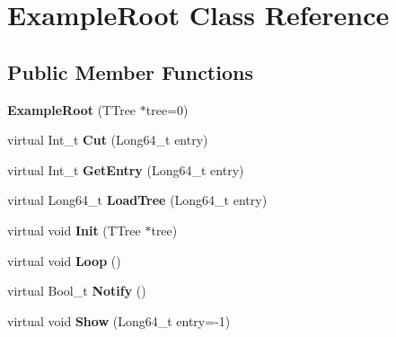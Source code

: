 \hypertarget{classExampleRoot}{
\section{ExampleRoot Class Reference}
\label{classExampleRoot}
}
\subsection*{Public Member Functions}
\begin{DoxyCompactItemize}
\item 
\hypertarget{classExampleRoot_a676a00459c76535ea0cc496333e0927f}{
{\bfseries ExampleRoot} (TTree $\ast$tree=0)}
\label{classExampleRoot_a676a00459c76535ea0cc496333e0927f}

\item 
\hypertarget{classExampleRoot_aa76fc5be93bb26800ef2d47b86db68ab}{
virtual Int\_\-t {\bfseries Cut} (Long64\_\-t entry)}
\label{classExampleRoot_aa76fc5be93bb26800ef2d47b86db68ab}

\item 
\hypertarget{classExampleRoot_aeaa244a73538e72d6d4431d6755e6aa9}{
virtual Int\_\-t {\bfseries GetEntry} (Long64\_\-t entry)}
\label{classExampleRoot_aeaa244a73538e72d6d4431d6755e6aa9}

\item 
\hypertarget{classExampleRoot_ad12d04e02467dc4541eaa95c112dfb65}{
virtual Long64\_\-t {\bfseries LoadTree} (Long64\_\-t entry)}
\label{classExampleRoot_ad12d04e02467dc4541eaa95c112dfb65}

\item 
\hypertarget{classExampleRoot_a6a24778d602dc1ecb97f8aeca9c2576c}{
virtual void {\bfseries Init} (TTree $\ast$tree)}
\label{classExampleRoot_a6a24778d602dc1ecb97f8aeca9c2576c}

\item 
\hypertarget{classExampleRoot_ac2cd7b771c6f1094df4278c2c81fa5d4}{
virtual void {\bfseries Loop} ()}
\label{classExampleRoot_ac2cd7b771c6f1094df4278c2c81fa5d4}

\item 
\hypertarget{classExampleRoot_ad2f3d94e1e75887a972eb220e55c6453}{
virtual Bool\_\-t {\bfseries Notify} ()}
\label{classExampleRoot_ad2f3d94e1e75887a972eb220e55c6453}

\item 
\hypertarget{classExampleRoot_ae352817f33d623e4a07ce448bc191533}{
virtual void {\bfseries Show} (Long64\_\-t entry=-\/1)}
\label{classExampleRoot_ae352817f33d623e4a07ce448bc191533}

\end{DoxyCompactItemize}
